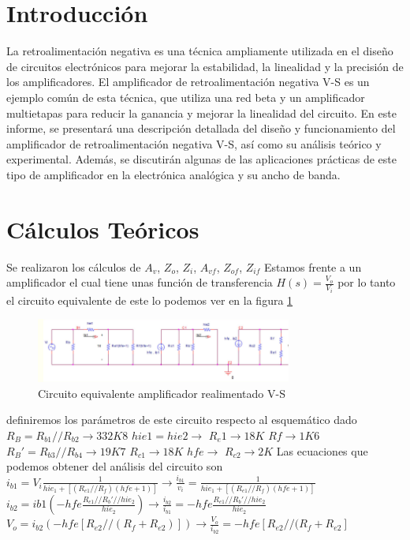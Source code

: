 \documentclass[12pt, letterpaper]{article}
\begin{document}
\newpage
\tableofcontents
\newpage

\section{Introducción}

La retroalimentación negativa es una técnica ampliamente utilizada en el diseño de circuitos electrónicos para mejorar la estabilidad, la linealidad y la precisión de los amplificadores.
El amplificador de retroalimentación negativa V-S es un ejemplo común de esta técnica, que utiliza una red beta y un amplificador multietapas para reducir la ganancia y mejorar la linealidad del circuito.
En este informe, se presentará una descripción detallada del diseño y funcionamiento del amplificador de retroalimentación negativa V-S, así como su análisis teórico y experimental.
Además, se discutirán algunas de las aplicaciones prácticas de este tipo de amplificador en la electrónica analógica y su ancho de banda.

\section{Cálculos Teóricos}
Se realizaron los cálculos de $A_v$, $Z_o$, $Z_i$, $A_{vf}$, $Z_{of}$, $Z_{if}$
\singlespacing
Estamos frente a un amplificador el cual tiene unas función de transferencia $H(s)=\frac{V_o}{V_i}
$ por lo tanto el circuito equivalente de este lo podemos ver en la figura \ref{fig:2.1}
\begin{figure}[h]
	\centering
	\includegraphics[width=0.75\textwidth]{Imagenes/Screenshot_57.png}
	\caption{Circuito equivalente amplificador realimentado V-S}
	\label{fig:2.1}
\end{figure}
\singlespacing
definiremos los parámetros de este circuito respecto al esquemático dado
\singlespacing
$R_B=R_{b1}//R_{b2} \rightarrow 332K8$\hspace{1cm} $hie1=hie2 \rightarrow$\hspace{1cm} $R_e1 \rightarrow 18K$
\singlespacing
$Rf \rightarrow 1K6$ \hspace{1cm} $R_B'=R_{b3}//R_{b4} \rightarrow 19K7$ \hspace{1cm} $R_{c1} \rightarrow18K$
\singlespacing
$hfe \rightarrow $ \hspace{1cm} $R_{c2} \rightarrow 2K$
\singlespacing
Las ecuaciones que podemos obtener del análisis del circuito son
\singlespacing
$i_{b1}=V_i\frac{1}{hie_1+[(R_{e1}//R_f)(hfe + 1)]} \rightarrow \frac{i_{b1}}{v_i}=\frac{1}{hie_1+[(R_{e1}//R_f)(hfe + 1)]}$
\singlespacing
$ i_{b2}=ib1(-hfe\frac{R_{e1}//R_b'//hie_2}{hie_2}) \rightarrow \frac{i_{b2}}{i_{b1}}=-hfe\frac{R_{e1}//R_b'//hie_2}{hie_2}$
\singlespacing
$V_o=i_{b2}(-hfe[R_{e2}//(R_f+R_{e2})]) \rightarrow \frac{V_o}{i_{b2}}=-hfe[R_{e2}//(R_f+R_{e2}]$
\end{document}
